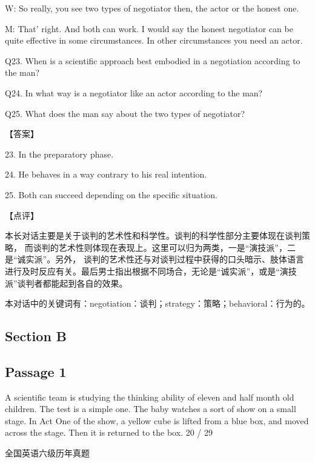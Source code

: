 \documentclass[UTF8,11pt]{ctexart}
\begin{document}
W: So really, you see two types of negotiator then, the actor or the honest one.


M: That’ right. And both can work. I would say the honest negotiator can be quite effective in some circumstances. In other circumstances you need an actor.


Q23. When is a scientific approach best embodied in a negotiation according to the man?


Q24. In what way is a negotiator like an actor according to the man?


Q25. What does the man say about the two types of negotiator?


【答案】


23. In the preparatory phase.


24. He behaves in a way contrary to his real intention.


25. Both can succeed depending on the specific situation.


【点评】


本长对话主要是关于谈判的艺术性和科学性。谈判的科学性部分主要体现在谈判策略， 而谈判的艺术性则体现在表现上。这里可以归为两类，一是“演技派”，二是“诚实派”。另外， 谈判的艺术性还与对谈判过程中获得的口头暗示、肢体语言进行及时反应有关。最后男士指出根据不同场合，无论是“诚实派”，或是“演技派”谈判者都能起到各自的效果。


本对话中的关键词有：negotiation：谈判；strategy：策略；behavioral：行为的。


\subsection*{Section B}


\subsection*{Passage 1}


A scientific team is studying the thinking ability of eleven and half month old children. The test is a simple one. The baby watches a sort of show on a small stage. In Act One of the show, a yellow cube is lifted from a blue box, and moved across the stage. Then it is returned to the box. 20 / 29


全国英语六级历年真题
\end{document}
